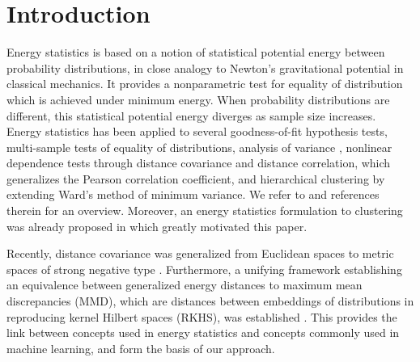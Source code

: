 \documentclass[aps,preprint,nofootinbib,floatfix]{revtex4-1}
\begin{document}
\maketitle

\section{Introduction}

Energy statistics \cite{Szkely2013}
is based on a 
notion of statistical potential energy between probability distributions,
in close analogy to Newton's gravitational
potential in classical mechanics. 
It provides a nonparametric test for equality of distribution which
is achieved under minimum energy. When probability distributions
are different, this statistical potential 
energy diverges as sample size increases.
Energy statistics has been applied to several goodness-of-fit 
hypothesis tests, 
multi-sample tests of equality of distributions, analysis of variance
\cite{RizzoVariance}, nonlinear
dependence tests through
distance covariance and distance correlation, which generalizes the Pearson
correlation coefficient, and  
hierarchical clustering \cite{RizzoClustering} by extending Ward's
method of minimum variance. We refer to \cite{Szkely2013} and 
references therein for an overview.
Moreover, an energy statistics formulation
to clustering was already proposed in \cite{Kgroups} 
which greatly motivated this paper.

Recently, distance covariance was 
generalized from Euclidean
spaces to metric spaces of strong negative type \cite{Lyons}.
Furthermore, a unifying framework establishing an equivalence
between generalized energy distances to maximum
mean discrepancies (MMD), which are distances between embeddings of
distributions in reproducing kernel Hilbert spaces (RKHS), was
established \cite{Sejdinovic2013}. This provides the 
link between concepts used in energy statistics and concepts
commonly used in machine learning, and form the basis of our approach.
\end{document}
